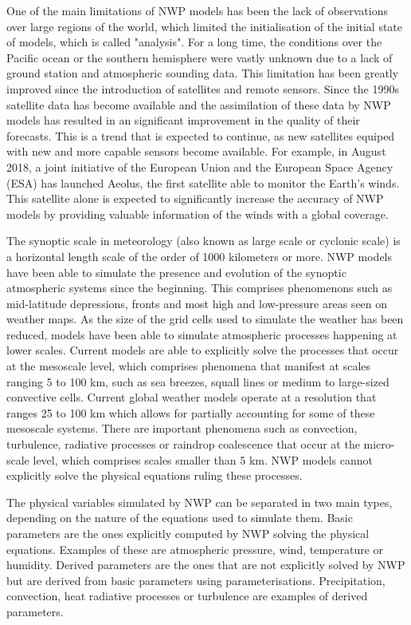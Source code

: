 One of the main limitations of NWP models has been the lack of observations over large regions of the world, which limited the initialisation of the initial state of models, which is called "analysis". For a long time, the conditions over the Pacific ocean or the southern hemisphere were vastly unknown due to a lack of ground station and atmospheric sounding data. This limitation has been greatly improved since the introduction of satellites and remote sensors. Since the 1990s satellite data has become available and the assimilation of these data by NWP models has resulted in an significant improvement in the quality of their forecasts. This is a trend that is expected to continue, as new satellites equiped with new and more capable sensors become available. For example, in August 2018, a joint initiative of the European Union and the European Space Agency (ESA) has launched Aeolus, the first satellite able to monitor the Earth's winds. This satellite alone is expected to significantly increase the accuracy of NWP models by providing valuable information of the winds with a global coverage.

\medskip

The synoptic scale in meteorology (also known as large scale or cyclonic scale) is a horizontal length scale of the order of 1000 kilometers or more. NWP models have been able to simulate the presence and evolution of the synoptic atmospheric systems since the beginning. This comprises phenomenons such as mid-latitude depressions, fronts and most high and low-pressure areas seen on weather maps. As the size of the grid cells used to simulate the weather has been reduced, models have been able to simulate atmospheric processes happening at lower scales. Current models are able to explicitly solve the processes that occur at the mesoscale level, which comprises phenomena that manifest at scales ranging 5 to 100 km, such as sea breezes, squall lines or medium to large-sized convective cells. Current global weather models operate at a resolution that ranges 25 to 100 km which allows for partially accounting for some of these mesoscale systems. There are important phenomena such as convection, turbulence, radiative processes or raindrop coalescence that occur at the micro-scale level, which comprises scales smaller than 5 km. NWP models cannot explicitly solve the physical equations ruling these processes.

\medskip

The physical variables simulated by NWP can be separated in two main types, depending on the nature of the equations used to simulate them. Basic parameters are the ones explicitly computed by NWP solving the physical equations. Examples of these are atmospheric pressure, wind, temperature or humidity. Derived parameters are the ones that are not explicitly solved by NWP but are derived from basic parameters using parameterisations. Precipitation, convection, heat radiative processes or turbulence are examples of derived parameters. 

